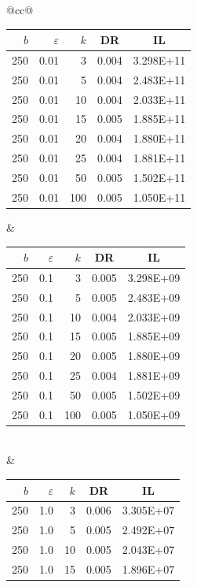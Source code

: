 \begin{table}[H]
	\centering
	\begin{tabular}{@{}cc@{}}
		\begin{tabular}{@{}rrrrr@{}}
			\toprule
			$b$ & $\varepsilon$ & $k$ & \multicolumn{1}{c}{DR} & \multicolumn{1}{c}{IL} \\ \midrule
			250 & 0.01 & 3   & 0.004 & 3.298E+11 \\
			250 & 0.01 & 5   & 0.004 & 2.483E+11 \\
			250 & 0.01 & 10  & 0.004 & 2.033E+11 \\
			250 & 0.01 & 15  & 0.005 & 1.885E+11 \\
			250 & 0.01 & 20  & 0.004 & 1.880E+11 \\
			250 & 0.01 & 25  & 0.004 & 1.881E+11 \\
			250 & 0.01 & 50  & 0.005 & 1.502E+11 \\
			250 & 0.01 & 100 & 0.005 & 1.050E+11 \\ \bottomrule
		\end{tabular}
		&
		\begin{tabular}{@{}rrrrr@{}}
			\toprule
			$b$ & $\varepsilon$ & $k$ & \multicolumn{1}{c}{DR} & \multicolumn{1}{c}{IL} \\ \midrule
			250 & 0.1 & 3   & 0.005 & 3.298E+09 \\
			250 & 0.1 & 5   & 0.005 & 2.483E+09 \\
			250 & 0.1 & 10  & 0.004 & 2.033E+09 \\
			250 & 0.1 & 15  & 0.005 & 1.885E+09 \\
			250 & 0.1 & 20  & 0.005 & 1.880E+09 \\
			250 & 0.1 & 25  & 0.004 & 1.881E+09 \\
			250 & 0.1 & 50  & 0.005 & 1.502E+09 \\
			250 & 0.1 & 100 & 0.005 & 1.050E+09 \\ \bottomrule
		\end{tabular}
		\\ & \\
		\begin{tabular}{@{}rrrrr@{}}
			\toprule
			$b$ & $\varepsilon$ & $k$ & \multicolumn{1}{c}{DR} & \multicolumn{1}{c}{IL} \\ \midrule
			250 & 1.0 & 3   & 0.006 & 3.305E+07 \\
			250 & 1.0 & 5   & 0.005 & 2.492E+07 \\
			250 & 1.0 & 10  & 0.005 & 2.043E+07 \\
			250 & 1.0 & 15  & 0.005 & 1.896E+07 \\

\end{tabular}
\end{tabular}
\end{table}
